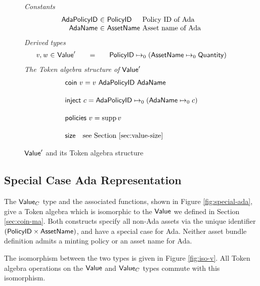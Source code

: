 \begin{figure*}[t!]
  \emph{Constants}
  \begin{equation*}
    \begin{array}{r@{~\in~}l@{~}lr}
      \mathsf{AdaPolicyID} & \PolicyID & \text{Policy ID of Ada} \\
      \mathsf{AdaName} & \AssetName & \text{Asset name of Ada}
    \end{array}
  \end{equation*}
  \emph{Derived types}
  \begin{equation*}
    \begin{array}{r@{~\in~}l@{\qquad=\qquad}lr}
      \var{v}, \var{w} & \Value'
      & \PolicyID \mapsto_0 ( \AssetName \mapsto_0 \Quantity )
    \end{array}
  \end{equation*}
  \emph{The Token algebra structure of $\mathsf{Value}'$}
  \begin{align*}
    & \fun{coin}~v = v~\mathsf{AdaPolicyID}~\mathsf{AdaName}
    \nextdef
    & \fun{inject}~c  = \mathsf{AdaPolicyID} \mapsto_0 (\mathsf{AdaName} \mapsto_0 c)
    \nextdef
    & \fun{policies}~v = \supp v
    \nextdef
    & \fun{size} ~~~ \text{see Section \ref{sec:value-size}}
  \end{align*}
  \caption{$\mathsf{Value}'$ and its Token algebra structure}
  \label{fig:no-special-ada}
\end{figure*}


\subsection{Special Case Ada Representation}
\label{sec:coin-value}

The $\mathsf{Value}_C$ type and the associated functions, shown in Figure \ref{fig:special-ada},
give a Token algebra which is isomorphic to the $\mathsf{Value}$ we defined in
Section \ref{sec:coin-ma}. Both constructs
specify all non-Ada assets via the unique identifier $(\mathsf{PolicyID} \times \mathsf{AssetName})$, and
have a special case for Ada. Neither asset bundle definition
admits a minting policy or an asset name for Ada.

The isomorphism between the two types is given in Figure \ref{fig:iso-v}.
All Token algebra operations on the $\mathsf{Value}$ and $\mathsf{Value}_C$ types commute with this
isomorphism.

